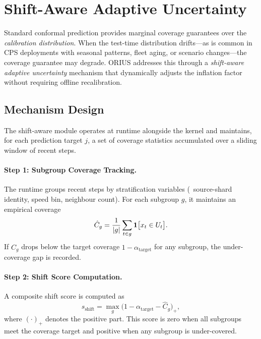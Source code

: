 \section{Shift-Aware Adaptive Uncertainty}\label{sec:shift}

Standard conformal prediction provides marginal coverage guarantees over the
\emph{calibration distribution}.  When the test-time distribution drifts---as is
common in CPS deployments with seasonal patterns, fleet aging, or scenario
changes---the coverage guarantee may degrade.  ORIUS addresses this through a
\emph{shift-aware adaptive uncertainty} mechanism that dynamically adjusts the
inflation factor without requiring offline recalibration.

\subsection{Mechanism Design}

The shift-aware module operates at runtime alongside the \dcs{} kernel and
maintains, for each prediction target $j$, a set of coverage statistics
accumulated over a sliding window of recent steps.

\paragraph{Step 1: Subgroup Coverage Tracking.}
The runtime groups recent steps by stratification variables (\eg~source-shard
identity, speed bin, neighbour count).  For each subgroup $g$, it maintains an empirical
coverage
\begin{equation}\label{eq:subgroup_cov}
  \hat{C}_g = \frac{1}{|g|}\sum_{t \in g} \mathbf{1}\bigl[x_t \in U_t\bigr].
\end{equation}
If $\hat{C}_g$ drops below the target coverage $1 - \alpha_{\mathrm{target}}$ for
any subgroup, the under-coverage gap is recorded.

\paragraph{Step 2: Shift Score Computation.}
A composite shift score is computed as
\begin{equation}\label{eq:shift_score}
  s_{\mathrm{shift}} = \max_{g} \bigl(1 - \alpha_{\mathrm{target}} - \hat{C}_g\bigr)_+,
\end{equation}
where $(\cdot)_+$ denotes the positive part.  This score is zero when all
subgroups meet the coverage target and positive when any subgroup is
under-covered.

